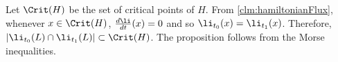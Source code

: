 

    Let $\Crit(H)$ be the set of critical points of $H$.
    From \cref{clm:hamiltonianFlux}, whenever $x\in \Crit(H)$, $\frac{d\li}{dt}(x)=0$ and so $\li_{t_0}(x)=\li_{t_1}(x)$.
    Therefore, $|\li_{t_0}(L)\cap \li_{t_1}(L)|\subset\Crit(H)$.
    The proposition follows from the Morse inequalities. 

